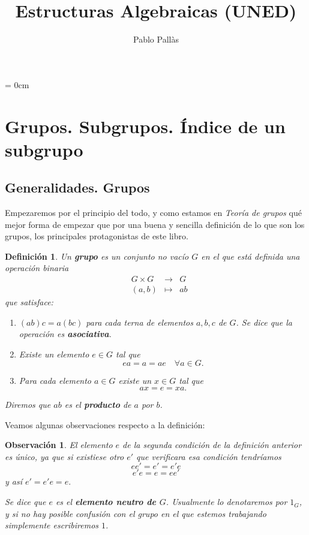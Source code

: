 \documentclass[12pt]{article}
\author{Pablo Pallàs}
\title{Estructuras Algebraicas (UNED)}
\newtheorem{definition}[theorem]{Definición}
\newtheorem{observation}{Observación}[theorem]
\begin{document}
\rmfamily
\maketitle
\vspace{2.5cm}
\tableofcontents
\parindent= 0cm
\newpage

\section{Grupos. Subgrupos. Índice de un subgrupo}
\subsection{Generalidades. Grupos}
Empezaremos por el principio del todo, y como estamos en \textit{Teoría de grupos} qué mejor forma de empezar que por una buena y sencilla definición de lo que son los grupos, los principales protagonistas de este libro.

\begin{definition}Un \textbf{grupo} es un conjunto no vacío $G$ en el que está definida una operación binaria $$\begin{array}{rccl}
&G \times G & \longrightarrow & G\\
&(a,b) & \longmapsto &ab
\end{array}
$$
que satisface: \begin{enumerate}
\item $(ab)c= a(bc)$ para cada terna de elementos $a,b,c$ de $G$. Se dice que la operación es \textbf{asociativa}.
\item Existe un elemento $e \in G$ tal que $$ea = a = ae \quad \forall a \in G.$$
\item Para cada elemento $a \in G$ existe un $x \in G$ tal que $$ax = e = xa.$$
\end{enumerate}
Diremos que $ab$ es el \textbf{producto} de $a$ por $b$.
\end{definition}

Veamos algunas observaciones respecto a la definición:

\begin{observation}El elemento $e$ de la segunda condición de la definición anterior es 
único, ya que si existiese otro $e'$ que verificara esa condición tendríamos $$ee' = e' = e'e$$ $$e'e = e = ee'$$ y así $e' = e'e = e.$

Se dice que $e$ es el \textbf{elemento neutro de $G$}. Usualmente lo denotaremos por $1_G$, y si no hay posible confusión con el grupo en el que estemos trabajando simplemente escribiremos $1$.
\end{observation}
\end{document}

